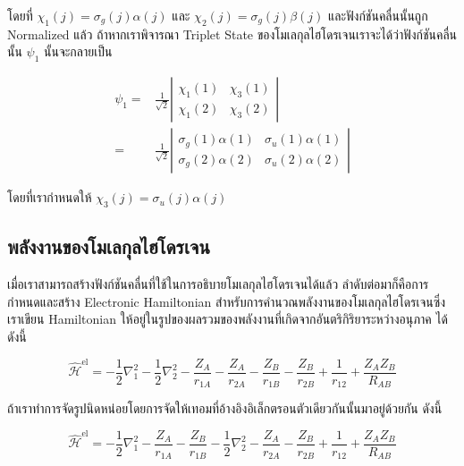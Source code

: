 \noindent โดยที่ $\chi_1(j) = \sigma_g(j) \alpha(j)$ และ $\chi_2(j) = \sigma_g(j) \beta(j)$ และฟังก์ชันคลื่นนั้นถูก
Normalized แล้ว ถ้าหากเราพิจารณา Triplet State ของโมเลกุลไฮโดรเจนเราจะได้ว่าฟังก์ชันคลื่นนั้น $\psi_1$ นั้นจะกลายเป็น

\begin{equation}
    \begin{aligned}
        \psi_1
        = &
        \frac{1}{\sqrt{2}}
        \left|
        \begin{array}{ll}
            \chi_1(1) & \chi_3(1) \\
            \chi_1(2) & \chi_3(2)
        \end{array}
        \right|                \\
        = & \frac{1}{\sqrt{2}}
        \left|
        \begin{array}{ll}
            \sigma_g(1) \alpha(1) & \sigma_u(1) \alpha(1) \\
            \sigma_g(2) \alpha(2) & \sigma_u(2) \alpha(2)
        \end{array}
        \right|
    \end{aligned}
\end{equation}

\noindent โดยที่เรากำหนดให้ $\chi_3(j) = \sigma_u(j) \alpha(j)$

\subsection{พลังงานของโมเลกุลไฮโดรเจน}

เมื่อเราสามารถสร้างฟังก์ชันคลื่นที่ใช้ในการอธิบายโมเลกุลไฮโดรเจนได้แล้ว ลำดับต่อมาก็คือการกำหนดและสร้าง Electronic Hamiltonian
สำหรับการคำนวณพลังงานของโมเลกุลไฮโดรเจนซึ่งเราเขียน Hamiltonian ให้อยู่ในรูปของผลรวมของพลังงานที่เกิดจากอันตริกิริยาระหว่างอนุภาค%
ได้ดังนี้

\begin{equation}
    \label{eq:Hamiltonian_H2}
    \hat{\mathscr{H}}^{\mathrm{el}}
    =
    -\frac{1}{2} \nabla_1^2
    -\frac{1}{2} \nabla_2^2
    -\frac{Z_A}{r_{1 A}}
    -\frac{Z_A}{r_{2 A}}
    -\frac{Z_B}{r_{1 B}}
    -\frac{Z_B}{r_{2 B}}
    +\frac{1}{r_{12}}
    +\frac{Z_A Z_B}{R_{A B}}
\end{equation}

\noindent ถ้าเราทำการจัดรูปนิดหน่อยโดยการจัดให้เทอมที่อ้างอิงอิเล็กตรอนตัวเดียวกันนั้นมาอยู่ด้วยกัน ดังนี้

\begin{equation}
    \hat{\mathscr{H}}^{\mathrm{el}}
    =
    -\frac{1}{2} \nabla_1^2
    -\frac{Z_A}{r_{1 A}}
    -\frac{Z_B}{r_{1 B}}
    -\frac{1}{2} \nabla_2^2
    -\frac{Z_A}{r_{2 A}}
    -\frac{Z_B}{r_{2 B}}
    +\frac{1}{r_{12}}
    +\frac{Z_A Z_B}{R_{A B}}
\end{equation}

